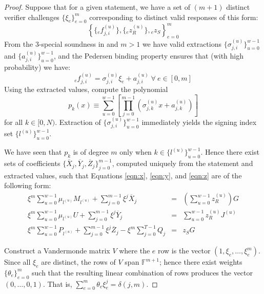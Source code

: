 \documentclass{article}
\newcommand{\F}{\mathbb{F}}
\newcommand{\sumj}{\sum_{j=0}^{m-1}}
\newcommand{\sumu}{\sum_{u=0}^{w-1}}
\theoremstyle{definition}
\begin{document}
\begin{proof}
Suppose that for a given statement, we have a set of $(m+1)$ distinct verifier challenges $\{\xi_e\}_{e=0}^m$ corresponding to distinct valid responses of this form:
$$\left\{ \{{}_ef^{(u)}_{j,i}\}, \{{}_ez^{(u)}_R\}, {}_ez_S \right\}_{e=0}^m$$
From the $3$-special soundness in \cite{bootle} and $m > 1$ we have valid extractions $\{\sigma^{(u)}_{j,i}\}_{u=0}^{w-1}$ and $\{a^{(u)}_{j,i}\}_{u=0}^{w-1}$, and the Pedersen binding property ensures that (with high probability) we have:
$${}_ef^{(u)}_{j,i} = \sigma^{(u)}_{j,i}\xi_e + a^{(u)}_{j,i} \; \forall \: e \in [0,m]$$
Using the extracted values, compute the polynomial
$$p_k(x) \equiv \sum_{u=0}^{w-1}\left[ \prod_{j=0}^{m-1} \left( \sigma^{(u)}_{j,k}x + a^{(u)}_{j,k} \right) \right]$$
for all $k \in [0,N)$.
Extraction of $\{\sigma^{(u)}_{j,i}\}_{u=0}^{w-1}$ immediately yields the signing index set $\{l^{(u)}\}_{u=0}^{w-1}$.

We have seen that $p_k$ is of degree $m$ only when $k \in \{l^{(u)}\}_{u=0}^{w-1}$.
Hence there exist sets of coefficients $\{\overline{X}_j,\overline{Y}_j,\overline{Z}_j\}_{j=0}^{m-1}$, computed uniquely from the statement and extracted values, such that Equations \ref{eqn:x}, \ref{eqn:y}, and \ref{eqn:z} are of the following form:
\begin{eqnarray*}
\xi^m \sumu \mu_{l^{(u)}}M_{l^{(u)}} + \sumj \xi^j\overline{X}_j &=& \left( \sumu z^{(u)}_R \right)G \\
\xi^m \sumu \mu_{l^{(u)}}U + \sumj \xi^j\overline{Y}_j &=& \sumu z^{(u)}_RJ^{(u)} \\
\xi^m \sumu P_{l^{(u)}} + \sumj \xi^j\overline{Z}_j - \xi^m \sum_{j=0}^{T-1} Q_j &=& z_SG
\end{eqnarray*}

Construct a Vandermonde matrix $V$ where the $e$ row is the vector $(1,\xi_e,\ldots,\xi^m_e)$.
Since all $\xi_e$ are distinct, the rows of $V$ span $\F^{m+1}$; hence there exist weights $\{\theta_e\}_{e=0}^m$ such that the resulting linear combination of rows produces the vector $(0,\ldots,0,1)$.
That is, $\sum_{e=0}^m \theta_e\xi_e^j = \delta(j,m)$.


\end{proof}
\end{document}
